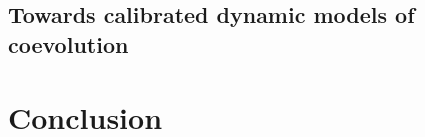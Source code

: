 \subsection{Towards calibrated dynamic models of coevolution}








\section{Conclusion}
















